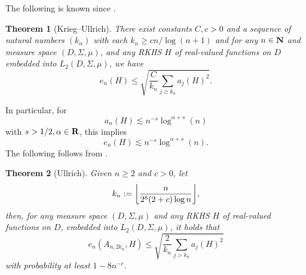 \documentclass[12pt, oneside]{amsart}
\newtheorem{thm}{Theorem}[section]
\theoremstyle{definition}
\theoremstyle{remark}
\numberwithin{equation}{section}
\begin{document}
The following is known since \cite{Krieg_2020}.
\begin{thm}[Krieg--Ullrich]\label{thm:kriegUllrich2020}
    There exist constants \(C, c > 0\) and a sequence of natural numbers \((k_n)\) with each \(k_n \geq cn/\log(n+1)\) and for any \(n \in \mathbf{N}\) and measure space \((D, \Sigma, \mu)\), and any RKHS \(H\) of real-valued functions on \(D\) embedded into \(L_2(D, \Sigma, \mu)\), we have \[
        e_n(H) \leq \sqrt{\frac{C}{k_n} \sum_{j \geq k_n} a_j(H)^2}.
    \]
\end{thm}
In particular, for 
\begin{equation}\label{eq:orderOfApproximationNumbers}
    a_n(H) \lesssim n^{-s} \log^{\alpha + s}(n)
\end{equation}
with \(s > 1/2, \alpha \in \mathbf{R}\), this implies \[
    e_n(H) \lesssim n^{-s} \log^{\alpha+s}(n).
\]
The following follows from \cite{Ullrich_2020}.
\begin{thm}[Ullrich]
    Given \(n \geq 2\) and \(c > 0\), let \[
        k_n := \floor*{\frac{n}{2^8 (2+c) \log n}},
    \]
    then, for any measure space \((D, \Sigma, \mu)\) and any RKHS \(H\) of real-valued functions on \(D\), embedded into \(L_2(D, \Sigma, \mu)\), it holds that \[
        e_n\left(A_{n, 2 k_n}, H\right) \leq \sqrt{ \frac{2}{k_n} \sum_{j > k_n} a_j(H)^2 }
    \]
    with probability at least \(1-8n^{-c}\).
\end{thm}
\end{document}
